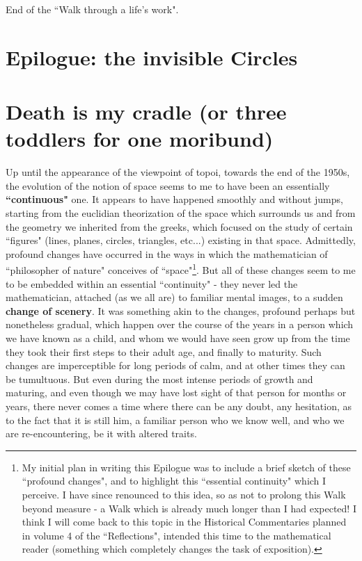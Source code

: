 \begin{flushright}
End of the ``Walk through a life's work". 
\end{flushright}

\section*{Epilogue: the invisible Circles}


\section{Death is my cradle (or three toddlers for one moribund)}

Up until the appearance of the viewpoint of topoi, towards the end of the 1950s, the evolution of the notion of space seems to me to have been an essentially \textbf{``continuous"} one. It appears to have happened smoothly and without jumps, starting from the euclidian theorization of the space which surrounds us and from the geometry we inherited from the greeks, which focused on the study of certain ``figures" (lines, planes, circles, triangles, etc...) existing in that space. Admittedly, profound changes have occurred in the ways in which the mathematician of ``philosopher of nature" conceives of ``space"\footnote{My initial plan in writing this Epilogue was to include a brief sketch of these ``profound changes", and to highlight this ``essential continuity" which I perceive. I have since renounced to this idea, so as not to prolong this Walk beyond measure - a Walk which is already much longer than I had expected! I think I will come back to this topic in the Historical Commentaries planned in volume 4 of the ``Reflections", intended this time to the mathematical reader (something which completely changes the task of exposition).}. But all of these changes seem to me to be embedded within an essential ``continuity" - they never led the mathematician, attached (as we all are) to familiar mental images, to a sudden \textbf{change of scenery}. It was something akin to the changes, profound perhaps but nonetheless gradual, which happen over the course of the years in a person which we have known as a child, and whom we would have seen grow up from the time they took their first steps  to their adult age, and finally to maturity. Such changes are imperceptible for long periods of calm, and at other times they can be tumultuous. But even during the most intense periods of growth and maturing, and even though we may have lost sight of that person for months or years, there never comes a time where there can be any doubt, any hesitation, as to the fact that it is still him, a familiar person who we know well, and who we are re-encountering, be it with altered traits. 


